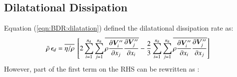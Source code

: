 \documentclass{warpdoc}
\newcommand{\nd}{{{n}_{\rm d}}}
\begin{document}
\subsection{Dilatational Dissipation}

Equation (\ref{eqn:BDR:dilatation}) defined the dilatational dissipation rate as:
%
\begin{equation}
 \wbar{\rho}\, \epsilon_d = 
    \overline{\eta/\rho}~ 
    \left[
      2 \sum_{i=1}^\nd \sum_{j=1}^\nd \overline{\rho \frac{\partial \bm{V}_i^{{\prime\prime}}}{\partial x_j}  \frac{\partial \bm{V}_j^{{\prime\prime}}}{\partial x_i}}
     -  \frac{2}{3}  \sum_{i=1}^{\nd} \sum_{j=1}^{\nd}
           \overline{ \rho  \frac{\partial \bm{V}_i^{{\prime\prime}}}{\partial x_i}  \frac{\partial \bm{V}_j^{{\prime\prime}}}{\partial x_j}}
    \right]
 \label{eqn:DDR:modeled:1}
\end{equation}
%
However, part of the first term on the RHS can be rewritten as \cite{turb:sarkar1991}:
%
\end{document}
